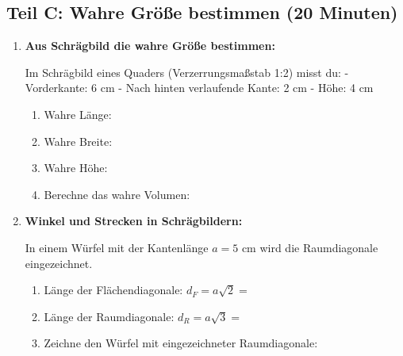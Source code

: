 \subsection*{Teil C: Wahre Größe bestimmen (20 Minuten)}

\begin{enumerate}[label=\arabic*.,resume]

    \item \textbf{Aus Schrägbild die wahre Größe bestimmen:}

    Im Schrägbild eines Quaders (Verzerrungsmaßstab 1:2) misst du:
    - Vorderkante: 6 cm
    - Nach hinten verlaufende Kante: 2 cm  
    - Höhe: 4 cm

    \begin{enumerate}[label=\alph*)]
        \item Wahre Länge: \underline{\hspace{4cm}}

        \item Wahre Breite: \underline{\hspace{4cm}}

        \item Wahre Höhe: \underline{\hspace{4cm}}

        \item Berechne das wahre Volumen:

        \vspace{2cm}

    \end{enumerate}

    \item \textbf{Winkel und Strecken in Schrägbildern:}

    In einem Würfel mit der Kantenlänge $a = 5$ cm wird die Raumdiagonale eingezeichnet.

    \begin{enumerate}[label=\alph*)]
        \item Länge der Flächendiagonale: $d_F = a\sqrt{2} = $ \underline{\hspace{4cm}}

        \item Länge der Raumdiagonale: $d_R = a\sqrt{3} = $ \underline{\hspace{4cm}}

        \item Zeichne den Würfel mit eingezeichneter Raumdiagonale:

        \vspace{6cm}

    \end{enumerate}

\end{enumerate}